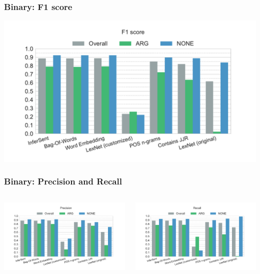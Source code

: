 \documentclass[11pt,aspectratio=169]{beamer}
\begin{document}
    \begin{frame}
        \frametitle{Binary: F1 score}
        \centerline{\includegraphics[scale=0.45,trim={0 0 0 0.5cm},clip]{images/experiments/hp-f1-True}}
    \end{frame}


    \begin{frame}
        \frametitle{Binary: Precision and Recall}
        \begin{columns}[t]
            \column{2in}
            \centerline{\includegraphics[scale=0.31,trim={2cm 0 0 0},clip]{images/experiments/hp-precision-True}}
            \column{2in}
            \centerline{\includegraphics[scale=0.31,trim={0 0 2cm 0},clip]{images/experiments/hp-recall-True}}

        \end{columns}
    \end{frame}
\end{document}
